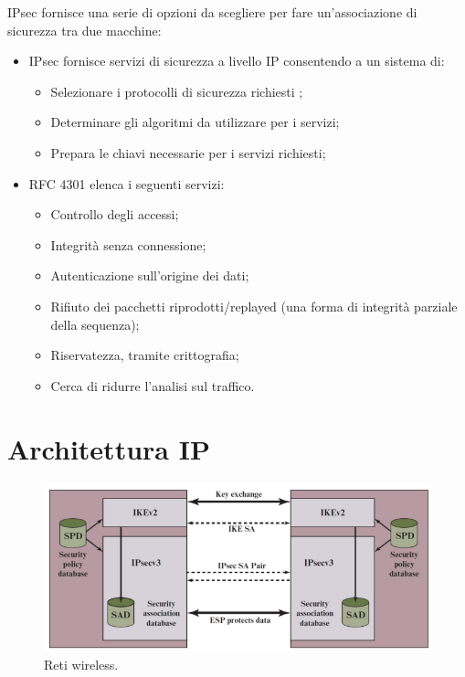 IPsec fornisce una serie di opzioni da scegliere per fare un'associazione di sicurezza tra due macchine:
\begin{itemize}
    \item IPsec fornisce servizi di sicurezza a livello IP consentendo a un sistema di: 
	\begin{itemize}
	    \item Selezionare i protocolli di sicurezza richiesti ;
		\item Determinare gli algoritmi da utilizzare per i servizi;
		\item Prepara le chiavi necessarie per i servizi richiesti;
	\end{itemize}
	\item RFC 4301 elenca i seguenti servizi:
	\begin{itemize}
	    \item Controllo degli accessi;
		\item Integrità senza connessione;
		\item Autenticazione sull'origine dei dati;
		\item Rifiuto dei pacchetti riprodotti/replayed (una forma di integrità parziale della sequenza);
		\item Riservatezza, tramite crittografia;
		\item Cerca di ridurre l'analisi sul traffico.
	\end{itemize}
\end{itemize}

\section{Architettura IP}

\begin{figure}[h]
    \centering
    \includegraphics[width=1\textwidth]{images/chapter9/9-1.png}
    \caption{Reti wireless.}
    \label{fig:9-1}
\end{figure}

